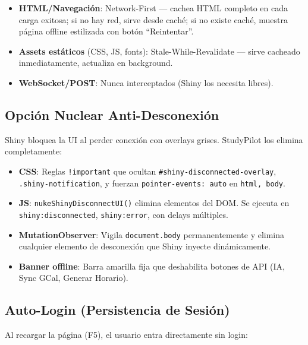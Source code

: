 \documentclass[
  spanish,
  11pt,
  a4paper,
]{article}
\providecommand{\tightlist}{%
  \setlength{\itemsep}{0pt}\setlength{\parskip}{0pt}}
\begin{document}
\begin{itemize}
\tightlist
\item
  \textbf{HTML/Navegación}: Network-First --- cachea HTML completo en
  cada carga exitosa; si no hay red, sirve desde caché; si no existe
  caché, muestra página offline estilizada con botón ``Reintentar''.
\item
  \textbf{Assets estáticos} (CSS, JS, fonts): Stale-While-Revalidate ---
  sirve cacheado inmediatamente, actualiza en background.
\item
  \textbf{WebSocket/POST}: Nunca interceptados (Shiny los necesita
  libres).
\end{itemize}

\subsection{Opción Nuclear
Anti-Desconexión}\label{opciuxf3n-nuclear-anti-desconexiuxf3n}

Shiny bloquea la UI al perder conexión con overlays grises. StudyPilot
los elimina completamente:

\begin{itemize}
\tightlist
\item
  \textbf{CSS}: Reglas \texttt{!important} que ocultan
  \texttt{\#shiny-disconnected-overlay}, \texttt{.shiny-notification}, y
  fuerzan \texttt{pointer-events:\ auto} en \texttt{html,\ body}.
\item
  \textbf{JS}: \texttt{nukeShinyDisconnectUI()} elimina elementos del
  DOM. Se ejecuta en \texttt{shiny:disconnected}, \texttt{shiny:error},
  con delays múltiples.
\item
  \textbf{MutationObserver}: Vigila \texttt{document.body}
  permanentemente y elimina cualquier elemento de desconexión que Shiny
  inyecte dinámicamente.
\item
  \textbf{Banner offline}: Barra amarilla fija que deshabilita botones
  de API (IA, Sync GCal, Generar Horario).
\end{itemize}

\subsection{Auto-Login (Persistencia de
Sesión)}\label{auto-login-persistencia-de-sesiuxf3n}

Al recargar la página (F5), el usuario entra directamente sin login:
\end{document}
